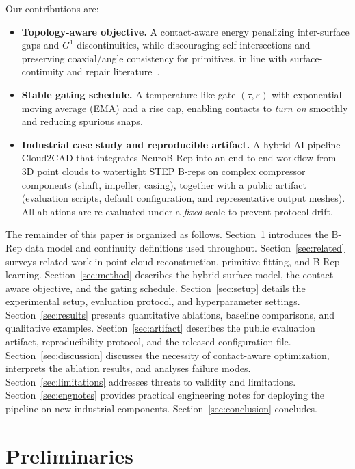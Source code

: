\documentclass{ieeeaccess}
\begin{document}
Our contributions are:
\begin{itemize}
  \item \textbf{Topology-aware objective.} A contact-aware energy penalizing inter-surface gaps and $G^1$ discontinuities, while discouraging self intersections and preserving coaxial/angle consistency for primitives, in line with surface-continuity and repair literature~\cite{b10,b11,b12,b22}.
  \item \textbf{Stable gating schedule.} A temperature-like gate $(\tau,\varepsilon)$ with exponential moving average (EMA) and a rise cap, enabling contacts to \emph{turn on} smoothly and reducing spurious snaps.
  \item \textbf{Industrial case study and reproducible artifact.} A hybrid AI pipeline Cloud2CAD that integrates NeuroB-Rep into an end-to-end workflow from 3D point clouds to watertight STEP B-reps on complex compressor components (shaft, impeller, casing), together with a public artifact (evaluation scripts, default configuration, and representative output meshes). All ablations are re-evaluated under a \emph{fixed} scale to prevent protocol drift.
\end{itemize}

The remainder of this paper is organized as follows.
Section~\ref{sec:prelim} introduces the B-Rep data model and continuity definitions used throughout.
Section~\ref{sec:related} surveys related work in point-cloud reconstruction, primitive fitting, and B-Rep learning.
Section~\ref{sec:method} describes the hybrid surface model, the contact-aware objective, and the gating schedule.
Section~\ref{sec:setup} details the experimental setup, evaluation protocol, and hyperparameter settings.
Section~\ref{sec:results} presents quantitative ablations, baseline comparisons, and qualitative examples.
Section~\ref{sec:artifact} describes the public evaluation artifact, reproducibility protocol, and the released configuration file.
Section~\ref{sec:discussion} discusses the necessity of contact-aware optimization, interprets the ablation results, and analyses failure modes.
Section~\ref{sec:limitations} addresses threats to validity and limitations.
Section~\ref{sec:engnotes} provides practical engineering notes for deploying the pipeline on new industrial components.
Section~\ref{sec:conclusion} concludes.


\section{Preliminaries}
\label{sec:prelim}
\end{document}
